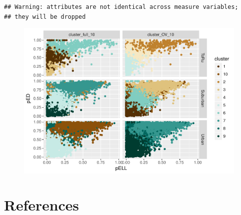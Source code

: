 \documentclass[floatsintext,man]{apa6}
\theoremstyle{definition}
\theoremstyle{definition}
\theoremstyle{definition}
\theoremstyle{remark}
\begin{document}
\begin{verbatim}
## Warning: attributes are not identical across measure variables;
## they will be dropped
\end{verbatim}

\begin{figure}
\centering
\includegraphics{Method_files/figure-latex/unnamed-chunk-5-1.pdf}
\caption{}
\end{figure}

\newpage

\section{References}\label{references}

\begingroup
\setlength{\parindent}{-0.5in} \setlength{\leftskip}{0.5in}

\hypertarget{refs}{}

\endgroup
\end{document}
